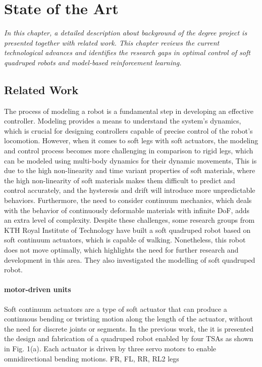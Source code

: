 \chapter{State of the Art}
\label{chap2}
\textit{In this chapter, a detailed description about background of the degree project is presented together with related work. This chapter reviews the current technological advances and identifies the research gaps in optimal control of soft quadruped robots and model-based reinforcement learning.}

\section{Related Work}
The process of modeling a robot is a fundamental step in developing an effective controller\cite{gromovModelingControlRobotic2019}. Modeling provides a means to understand the system's dynamics, which is crucial for designing controllers capable of precise control of the robot's locomotion. However, when it comes to soft legs with soft actuators, the modeling and control process becomes more challenging in comparison to rigid legs, which can be modeled using multi-body dynamics for their dynamic movements, This is due to the high non-linearity\cite{slotineAppliedNonlinearControl1991} and time variant properties\cite{wangControlStrategiesSoft2022} of soft materials, where the high non-linearity of soft materials makes them difficult to predict and control accurately, and the hysteresis and drift will introduce more unpredictable behaviors. Furthermore, the need to consider continuum mechanics, which deals with the behavior of continuously deformable materials with infinite \ac{DoF}\cite{polygerinosSoftRoboticsReview2017}, adds an extra level of complexity. Despite these challenges, some research groups from KTH Royal Institute of Technology\cite{jiSynthesizingOptimalGait2022,daneliaStructureGaitOptimizationof2021,thorapallimuralidharanContinuumActuatorBased2020,jiLearningbasedControl4D} have built a soft quadruped robot based on soft continuum actuators, which is capable of walking. Nonetheless, this robot does not move optimally, which highlights the need for further research and development in this area. They also investigated the modelling of soft quadruped robot. 

\subsubsection{motor-driven units}
Soft continuum actuators are a type of soft actuator that can produce a continuous bending or twisting motion along the length of the actuator, without the need for discrete joints or segments. In the previous work\cite{muralidharanSoftQuadrupedRobot2021}, the it is presented the design and fabrication of a quadruped robot enabled by four TSAs as shown in Fig. 1(a). Each actuator is driven by three servo motors to enable omnidirectional bending motions.
\ac{FR}, \ac{FL}, \ac{RR}, \ac{RL2} legs

